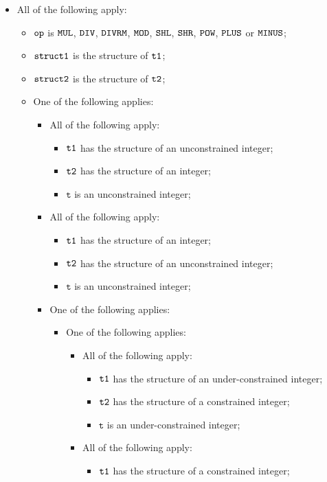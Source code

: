 \documentclass{book}
\newcommand\vt[0]{\texttt{t}}
\begin{document}
\begin{itemize}
  \item All of the following apply:
  \begin{itemize}
    \item $\texttt{op}$ is $\texttt{MUL}$, $\texttt{DIV}$, $\texttt{DIVRM}$, $\texttt{MOD}$, $\texttt{SHL}$, $\texttt{SHR}$, $\texttt{POW}$, $\texttt{PLUS}$ or $\texttt{MINUS}$;
    \item $\texttt{struct1}$ is the structure of $\texttt{t1}$;
    \item $\texttt{struct2}$ is the structure of $\texttt{t2}$;
    \item One of the following applies:
    \begin{itemize}
      \item All of the following apply:
      \begin{itemize}
        \item $\texttt{t1}$ has the structure of an unconstrained integer;
        \item $\texttt{t2}$ has the structure of an integer;
        \item $\vt$ is an unconstrained integer;
      \end{itemize}
      \item All of the following apply:
      \begin{itemize}
        \item $\texttt{t1}$ has the structure of an integer;
        \item $\texttt{t2}$ has the structure of an unconstrained integer;
        \item $\vt$ is an unconstrained integer;
      \end{itemize}
      \item One of the following applies:
      \begin{itemize}
        \item One of the following applies:
        \begin{itemize}
          \item All of the following apply:
          \begin{itemize}
            \item $\texttt{t1}$ has the structure of an under-constrained integer;
            \item $\texttt{t2}$ has the structure of a constrained integer;
            \item $\vt$ is an under-constrained integer;
          \end{itemize}
          \item All of the following apply:
          \begin{itemize}
            \item $\texttt{t1}$ has the structure of a constrained integer;

\end{itemize}
\end{itemize}
\end{itemize}
\end{itemize}
\end{itemize}
\end{itemize}
\end{document}

